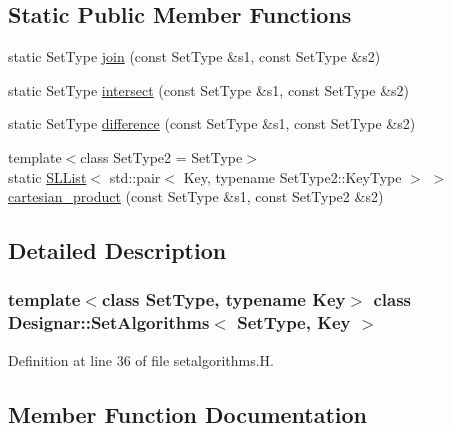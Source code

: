 \subsection*{Static Public Member Functions}
\begin{DoxyCompactItemize}
\item 
static Set\+Type \hyperlink{class_designar_1_1_set_algorithms_a7c90ff36ab84939edeebc6a35a4d8470}{join} (const Set\+Type \&s1, const Set\+Type \&s2)
\item 
static Set\+Type \hyperlink{class_designar_1_1_set_algorithms_a164c8098fec320646d65b4e20d62dc15}{intersect} (const Set\+Type \&s1, const Set\+Type \&s2)
\item 
static Set\+Type \hyperlink{class_designar_1_1_set_algorithms_a913f9ab2d7513f80ea82bddd46b70b2b}{difference} (const Set\+Type \&s1, const Set\+Type \&s2)
\item 
{\footnotesize template$<$class Set\+Type2  = Set\+Type$>$ }\\static \hyperlink{class_designar_1_1_s_l_list}{S\+L\+List}$<$ std\+::pair$<$ Key, typename Set\+Type2\+::\+Key\+Type $>$ $>$ \hyperlink{class_designar_1_1_set_algorithms_a073d248569ea209dd02729486c617047}{cartesian\+\_\+product} (const Set\+Type \&s1, const Set\+Type2 \&s2)
\end{DoxyCompactItemize}


\subsection{Detailed Description}
\subsubsection*{template$<$class Set\+Type, typename Key$>$\newline
class Designar\+::\+Set\+Algorithms$<$ Set\+Type, Key $>$}



Definition at line 36 of file setalgorithms.\+H.



\subsection{Member Function Documentation}
\mbox{\label{class_designar_1_1_set_algorithms_a073d248569ea209dd02729486c617047}} 
